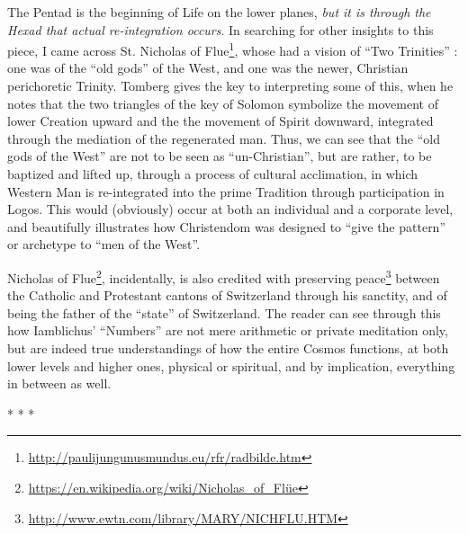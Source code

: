 The Pentad is the beginning of Life on the lower planes, \emph{but it is through the Hexad that actual re-integration occurs}. In searching for other insights to this piece, I came across St. Nicholas of Flue\footnote{\url{http://paulijungunusmundus.eu/rfr/radbilde.htm}}, whose had a vision of ``Two Trinities'' : one was of the ``old gods'' of the West, and one was the newer, Christian perichoretic Trinity. Tomberg gives the key to interpreting some of this, when he notes that the two triangles of the key of Solomon symbolize the movement of lower Creation upward and the the movement of Spirit downward, integrated through the mediation of the regenerated man. Thus, we can see that the ``old gods of the West'' are not to be seen as ``un-Christian'', but are rather, to be baptized and lifted up, through a process of cultural acclimation, in which Western Man is re-integrated into the prime Tradition through participation in Logos. This would (obviously) occur at both an individual and a corporate level, and beautifully illustrates how Christendom was designed to ``give the pattern'' or archetype to ``men of the West''.

Nicholas of Flue\footnote{\url{https://en.wikipedia.org/wiki/Nicholas\_of\_Flüe}}, incidentally, is also credited with preserving peace\footnote{\url{http://www.ewtn.com/library/MARY/NICHFLU.HTM}} between the Catholic and Protestant cantons of Switzerland through his sanctity, and of being the father of the ``state'' of Switzerland. The reader can see through this how Iamblichus' ``Numbers'' are not mere arithmetic or private meditation only, but are indeed true understandings of how the entire Cosmos functions, at both lower levels and higher ones, physical or spiritual, and by implication, everything in between as well.



\begin{center}* * *\end{center}

